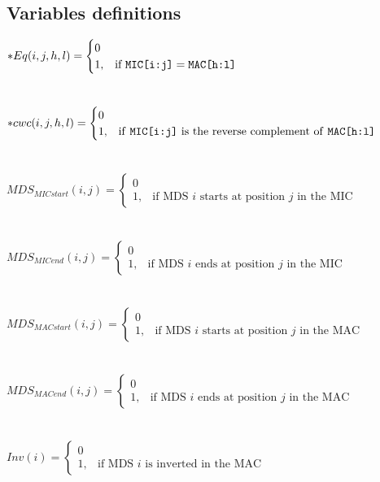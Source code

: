 \label{ilp_form}
\subsection{Variables definitions}

$*Eq(i,j,h,l) = \begin{cases} 0 \\ 1, & \mbox{if } \texttt{MIC[i:j]} = \texttt{MAC[h:l]} \end{cases}$ \\\\\\
$*cwc(i,j,h,l) = \begin{cases} 0 \\ 1, & \mbox{if \texttt{MIC[i:j]} is the reverse complement of \texttt{MAC[h:l]}} \end{cases}$ \\\\\\
$MDS_{MICstart}(i,j) = \begin{cases} 0 \\ 1, & \mbox{if MDS } i\mbox{ starts at position } j \mbox{ in the MIC} \end{cases}$ \\\\\\
$MDS_{MICend}(i,j) = \begin{cases} 0 \\ 1, & \mbox{if MDS } i\mbox{ ends at position } j \mbox{ in the MIC} \end{cases}$ \\\\\\
$MDS_{MACstart}(i,j) = \begin{cases} 0 \\ 1, & \mbox{if MDS } i\mbox{ starts at position } j \mbox{ in the MAC} \end{cases}$ \\\\\\
$MDS_{MACend}(i,j) = \begin{cases} 0 \\ 1, & \mbox{if MDS } i\mbox{ ends at position } j \mbox{ in the MAC} \end{cases}$ \\\\\\
$Inv(i) = \begin{cases} 0 \\ 1, & \mbox{if MDS } i\mbox{ is inverted in the MAC } \end{cases}$ \\\\\\
